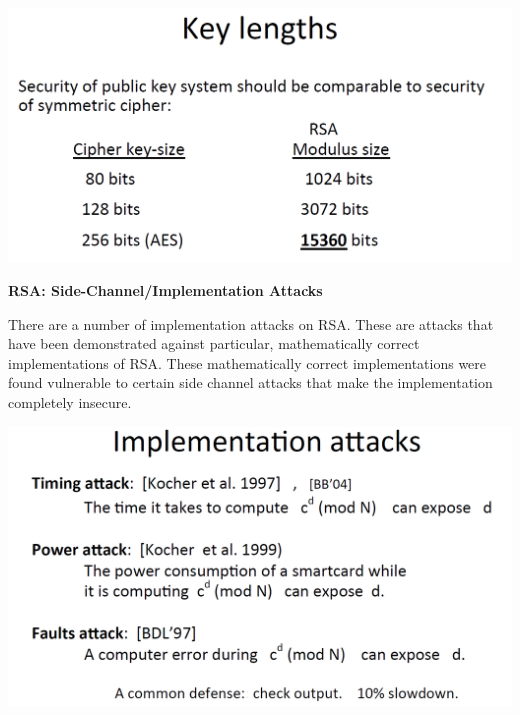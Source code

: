 \documentclass[11pt]{article}
\makeatletter
\def\maxwidth{\ifdim\Gin@nat@width>\linewidth\linewidth
    \else\Gin@nat@width\fi}
\let\Oldincludegraphics\includegraphics
\renewcommand{\includegraphics}[1]{\Oldincludegraphics[width=.8\maxwidth]{#1}}
\makeatother
\begin{document}
\includegraphics{./Images/RSAModSize.png}

\textbf{RSA: Side-Channel/Implementation Attacks}

There are a number of implementation attacks on RSA. These are attacks
that have been demonstrated against particular, mathematically correct
implementations of RSA. These mathematically correct implementations
were found vulnerable to certain side channel attacks that make the
implementation completely insecure.

\includegraphics{./Images/RSA-ImplementationAttacks.png}
\end{document}
